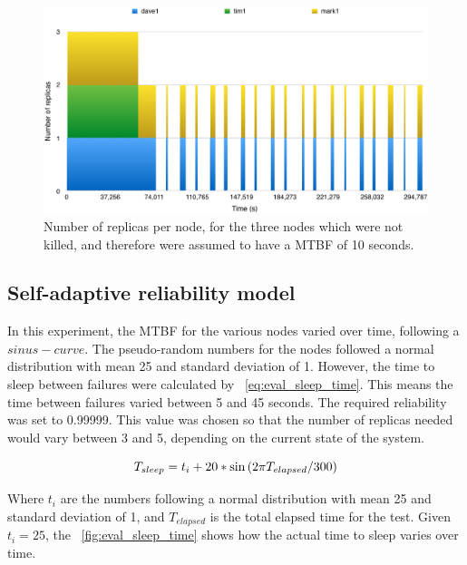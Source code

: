 \documentclass{cslthse-msc}
\begin{document}
\begin{figure}[!hbt]
\centering
\includegraphics[scale=0.5]{images/results/optimal_replicas/2/MTBF_10.pdf}
\caption{Number of replicas per node, for the three nodes which were not killed, and therefore were assumed to have a MTBF of 10 seconds.} \label{fig:exp_opt_replicas_MTBF_10_2}
\end{figure}


\subsection{Self-adaptive reliability model} \label{sec:eval_adaptive_rel_model}
In this experiment, the MTBF for the various nodes varied over time, following a $sinus-curve$. The pseudo-random numbers for the nodes followed a normal distribution with mean 25 and standard deviation of 1. However, the time to sleep between failures were calculated by ~\ref{eq:eval_sleep_time}. This means the time between failures varied between 5 and 45 seconds. The required reliability was set to 0.99999. This value was chosen so that the number of replicas needed would vary between 3 and 5, depending on the current state of the system.

\begin{equation} \label{eq:eval_sleep_time}
T_{sleep} = t_i + 20 * \sin{(2\*\pi\*T_{elapsed} / 300)}
\end{equation}

Where $t_i$ are the numbers following a normal distribution with mean 25 and standard deviation of 1, and $T_{elapsed}$ is the total elapsed time for the test. Given $t_i=25$, the ~\cref{fig:eval_sleep_time} shows how the actual time to sleep varies over time.
\end{document}
